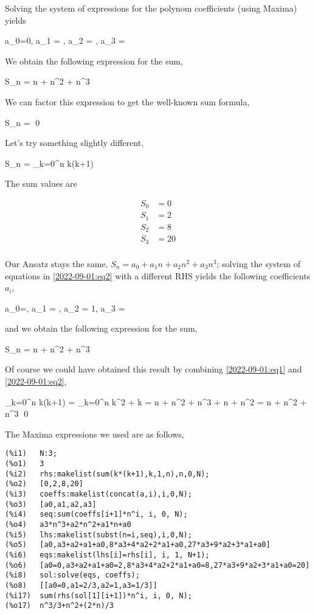 Solving the system of expressions for the polynom coefficients (using Maxima) yields

\bee
a_0=0, a_1 = , a_2 = , a_3 = 
\eee

We obtain the following expression for the sum,

\be\label{2022-09-01:eq2}
S_n = n + n^2 + n^3
\ee

We can factor this expression to get the well-known sum formula,

\bee
S_n =  \qed
\eee

Let's try something slightly different,

\bee
S_n = \sum_{k=0}^n k(k+1)
\eee

The sum values are

\begin{align*}
  S_0 &= 0 \\
  S_1 &= 2 \\
  S_2 &= 8 \\
  S_3 &= 20 \\
\end{align*}

Our Ansatz stays the same, $S_n = a_0 + a_1 n + a_2 n^2 + a_3 n^3$; solving the system of equations in \eqref{2022-09-01:eq2} with a different RHS yields the following coefficients $a_i$,

\bee
a_0=, a_1 = , a_2 = 1, a_3 = 
\eee

and we obtain the following expression for the sum,

\bee
S_n = n + n^2 + n^3
\eee

Of course we could have obtained this result by combining \eqref{2022-09-01:eq1} and \eqref{2022-09-01:eq2},

\bee
\sum_{k=0}^n k(k+1) = \sum_{k=0}^n k^2 + k = n + n^2 + n^3 + n + n^2 = n + n^2 + n^3 \qed
\eee

The Maxima expressions we used are as follows,

\begin{verbatim}
(%i1)	N:3;
(%o1)	3
(%i2)	rhs:makelist(sum(k*(k+1),k,1,n),n,0,N);
(%o2)	[0,2,8,20]
(%i3)	coeffs:makelist(concat(a,i),i,0,N);
(%o3)	[a0,a1,a2,a3]
(%i4)	seq:sum(coeffs[i+1]*n^i, i, 0, N);
(%o4)	a3*n^3+a2*n^2+a1*n+a0
(%i5)	lhs:makelist(subst(n=i,seq),i,0,N);
(%o5)	[a0,a3+a2+a1+a0,8*a3+4*a2+2*a1+a0,27*a3+9*a2+3*a1+a0]
(%i6)	eqs:makelist(lhs[i]=rhs[i], i, 1, N+1);
(%o6)	[a0=0,a3+a2+a1+a0=2,8*a3+4*a2+2*a1+a0=8,27*a3+9*a2+3*a1+a0=20]
(%i8)	sol:solve(eqs, coeffs);
(%o8)	[[a0=0,a1=2/3,a2=1,a3=1/3]]
(%i17)	sum(rhs(sol[1][i+1])*n^i, i, 0, N);
(%o17)	n^3/3+n^2+(2*n)/3
\end{verbatim}


